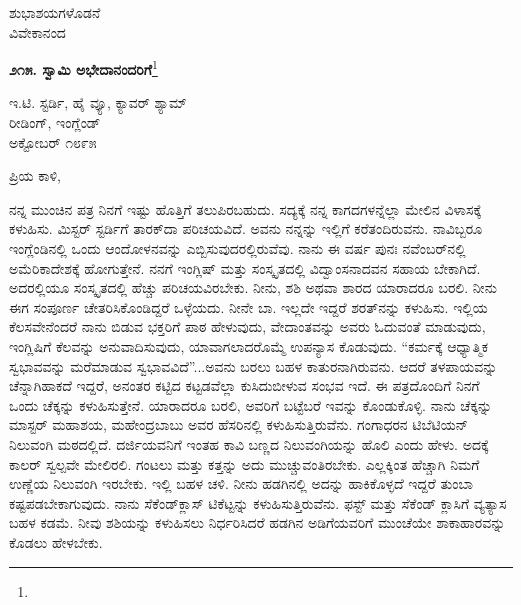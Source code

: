 \vspace{-0.5cm}

{\flushright
ಶುಭಾಶಯಗಳೊಡನೆ\\ವಿವೇಕಾನಂದ\par}

\begin{center}
\textbf{೨೧೫. ಸ್ವಾಮಿ ಅಭೇದಾನಂದರಿಗೆ}\footnote{}
\end{center}

\vspace{-0.5cm}

\begin{flushright}
 ಇ.ಟಿ. ಸ್ಟರ್ಡಿ, ಹೈ ವ್ಯೂ, ಕ್ಯಾವರ್ ಶ್ಯಾಮ್\\ರೀಡಿಂಗ್, ಇಂಗ್ಲೆಂಡ್\\ಅಕ್ಟೋಬರ್ ೧೮೯೫
\end{flushright}

\vspace{-0.3cm}

\noindent
ಪ್ರಿಯ ಕಾಳಿ,

ನನ್ನ ಮುಂಚಿನ ಪತ್ರ ನಿನಗೆ ಇಷ್ಟು ಹೊತ್ತಿಗೆ ತಲುಪಿರಬಹುದು. ಸದ್ಯಕ್ಕೆ ನನ್ನ ಕಾಗದಗಳನ್ನೆಲ್ಲಾ ಮೇಲಿನ ವಿಳಾಸಕ್ಕೆ ಕಳುಹಿಸು. ಮಿಸ್ಟರ್‌ ಸ್ಟರ್ಡಿಗೆ ತಾರಕ್‌ದಾ ಪರಿಚಯವಿದೆ. ಅವನು ನನ್ನನ್ನು ಇಲ್ಲಿಗೆ ಕರೆತಂದಿರುವನು. ನಾವಿಬ್ಬರೂ ಇಂಗ್ಲೆಂಡಿನಲ್ಲಿ ಒಂದು ಆಂದೋಳನವನ್ನು ಎಬ್ಬಿಸುವುದರಲ್ಲಿರುವೆವು. ನಾನು ಈ ವರ್ಷ ಪುನಃ ನವೆಂಬರ್‌ನಲ್ಲಿ ಅಮೆರಿಕಾದೇಶಕ್ಕೆ ಹೋಗುತ್ತೇನೆ. ನನಗೆ ಇಂಗ್ಲಿಷ್ ಮತ್ತು ಸಂಸ್ಕೃತದಲ್ಲಿ ವಿದ್ವಾಂಸನಾದವನ ಸಹಾಯ ಬೇಕಾಗಿದೆ. ಅದರಲ್ಲಿಯೂ ಸಂಸ್ಕೃತದಲ್ಲಿ ಹೆಚ್ಚು ಪರಿಚಯವಿರಬೇಕು. ನೀನು, ಶಶಿ ಅಥವಾ ಶಾರದ ಯಾರಾದರೂ ಬರಲಿ. ನೀನು ಈಗ ಸಂಪೂರ್ಣ ಚೇತರಿಸಿಕೊಂಡಿದ್ದರೆ ಒಳ್ಳೆಯದು. ನೀನೇ ಬಾ. ಇಲ್ಲದೇ ಇದ್ದರೆ ಶರತ್‌ನನ್ನು ಕಳುಹಿಸು. ಇಲ್ಲಿಯ ಕೆಲಸವೇನೆಂದರೆ ನಾನು ಬಿಡುವ ಭಕ್ತರಿಗೆ ಪಾಠ ಹೇಳುವುದು, ವೇದಾಂತವನ್ನು ಅವರು ಓದುವಂತೆ ಮಾಡುವುದು, ಇಂಗ್ಲಿಷಿಗೆ ಕೆಲವನ್ನು ಅನುವಾದಿಸುವುದು, ಯಾವಾಗಲಾದರೊಮ್ಮೆ ಉಪನ್ಯಾಸ ಕೊಡುವುದು. “ಕರ್ಮಕ್ಕೆ ಆಧ್ಯಾತ್ಮಿಕ ಸ್ವಭಾವವನ್ನು ಮರೆಮಾಡುವ ಸ್ವಭಾವವಿದೆ”...ಅವನು ಬರಲು ಬಹಳ ಕಾತುರನಾಗಿರುವನು. ಆದರೆ ತಳಪಾಯವನ್ನು ಚೆನ್ನಾಗಿಹಾಕದೆ ಇದ್ದರೆ, ಅನಂತರ ಕಟ್ಟಿದ ಕಟ್ಟಡವೆಲ್ಲಾ ಕುಸಿದುಬೀಳುವ ಸಂಭವ ಇದೆ. ಈ ಪತ್ರದೊಂದಿಗೆ ನಿನಗೆ ಒಂದು ಚೆಕ್ಕನ್ನು ಕಳುಹಿಸುತ್ತೇನೆ. ಯಾರಾದರೂ ಬರಲಿ, ಅವರಿಗೆ ಬಟ್ಟೆಬರೆ ಇವನ್ನು ಕೊಂಡುಕೊಳ್ಳಿ. ನಾನು ಚೆಕ್ಕನ್ನು ಮಾಸ್ಟರ್ ಮಹಾಶಯ, ಮಹೇಂದ್ರಬಾಬು ಅವರ ಹೆಸರಿನಲ್ಲಿ ಕಳುಹಿಸುತ್ತಿರುವೆನು. ಗಂಗಾಧರನ ಟಿಬೆಟಿಯನ್ ನಿಲುವಂಗಿ ಮಠದಲ್ಲಿದೆ. ದರ್ಜಿಯವನಿಗೆ ಇಂತಹ ಕಾವಿ ಬಣ್ಣದ ನಿಲುವಂಗಿಯನ್ನು ಹೊಲಿ ಎಂದು ಹೇಳು. ಅದಕ್ಕೆ ಕಾಲರ್ ಸ್ವಲ್ಪವೇ ಮೇಲಿರಲಿ. ಗಂಟಲು ಮತ್ತು ಕತ್ತನ್ನು ಅದು ಮುಚ್ಚುವಂತಿರಬೇಕು. ಎಲ್ಲಕ್ಕಿಂತ ಹೆಚ್ಚಾಗಿ ನಿಮಗೆ ಉಣ್ಣೆಯ ನಿಲುವಂಗಿ ಇರಬೇಕು. ಇಲ್ಲಿ ಬಹಳ ಚಳಿ. ನೀನು ಹಡಗಿನಲ್ಲಿ ಅದನ್ನು ಹಾಕಿಕೊಳ್ಳದೆ ಇದ್ದರೆ ತುಂಬಾ ಕಷ್ಟಪಡಬೇಕಾಗುವುದು. ನಾನು ಸೆಕೆಂಡ್‌ಕ್ಲಾಸ್ ಟಿಕೆಟ್ಟನ್ನು ಕಳುಹಿಸುತ್ತಿರುವೆನು. ಫಸ್ಟ್ ಮತ್ತು ಸೆಕೆಂಡ್ ಕ್ಲಾಸಿಗೆ ವ್ಯತ್ಯಾಸ ಬಹಳ ಕಡಮೆ. ನೀವು ಶಶಿಯನ್ನು ಕಳುಹಿಸಲು ನಿರ್ಧರಿಸಿದರೆ ಹಡಗಿನ ಅಡಿಗೆಯವರಿಗೆ ಮುಂಚೆಯೇ ಶಾಕಾಹಾರವನ್ನು ಕೊಡಲು ಹೇಳಬೇಕು.
\vspace{0.4cm}

